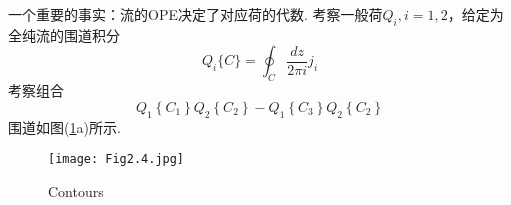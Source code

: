 一个重要的事实：流的OPE决定了对应荷的代数. 考察一般荷$Q_{i}, i=1,2$，给定为全纯流的围道积分
\begin{equation}
Q_{i}\{C\}=\oint_{C} \frac{d z}{2 \pi i} j_{i}
\end{equation}
考察组合
\begin{equation}\label{2.6.12}
Q_{1}\left\{C_{1}\right\} Q_{2}\left\{C_{2}\right\}-Q_{1}\left\{C_{3}\right\} Q_{2}\left\{C_{2}\right\}
\end{equation}
围道如图(\ref{Fig2.4}a)所示.\\
\begin{figure}
	\begin{center}
		\texttt{[image: Fig2.4.jpg]}\\
		\caption{Contours}\label{Fig2.4}
	\end{center}
\end{figure}


